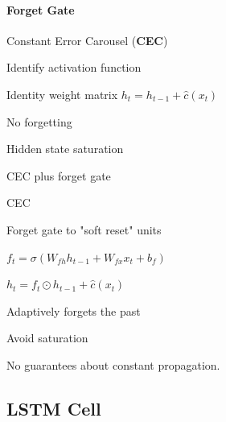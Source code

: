 \documentclass[10pt]{report}
\begin{document}
\paragraph{Forget Gate} Constant Error Carousel (\textbf{CEC})\begin{list}{}{}
	\item Identify activation function
	\item Identity weight matrix $h_t = h_{t-1} +\hat{c}(x_t)$
	\item No forgetting
	\item Hidden state saturation
\end{list}
CEC plus forget gate
\begin{list}{}{}
	\item CEC
	\item Forget gate to "soft reset" units
	\begin{list}{}{}
		\item $f_t = \sigma(W_{fh}h_{t-1} + W_{fx}x_t + b_f)$
		\item $h_t = f_t\odot h_{t-1} + \hat{c}(x_t)$
	\end{list}
	\item Adaptively forgets the past
	\item Avoid saturation
	\item No guarantees about constant propagation.
\end{list}
\subsection{LSTM Cell}
\end{document}
